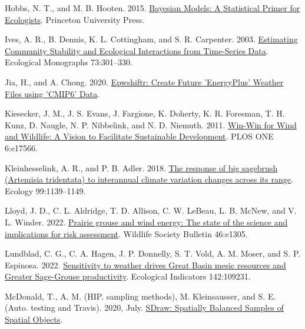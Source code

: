 \documentclass[
  12pt,
]{article}
\newlength{\cslhangindent}
\newlength{\cslentryspacingunit} %
\newenvironment{CSLReferences}[2] %
 {%
  \setlength{\parindent}{0pt}
  \ifodd #1
  \let\oldpar\par
  \def\par{\hangindent=\cslhangindent\oldpar}
  \fi
  \setlength{\parskip}{#2\cslentryspacingunit}
 }%
 {}
\begin{document}
\begin{CSLReferences}{1}{0}
\leavevmode{}%
Hobbs, N. T., and M. B. Hooten. 2015. \href{https://press.princeton.edu/books/hardcover/9780691159287/bayesian-models}{Bayesian {Models}: {A} {Statistical} {Primer} for {Ecologists}}. Princeton University Press.

\leavevmode{}%
Ives, A. R., B. Dennis, K. L. Cottingham, and S. R. Carpenter. 2003. \href{https://doi.org/10.1890/0012-9615(2003)073\%5B0301:ECSAEI\%5D2.0.CO;2}{Estimating {Community} {Stability} and {Ecological} {Interactions} from {Time}-{Series} {Data}}. Ecological Monographs 73:301--330.

\leavevmode{}%
Jia, H., and A. Chong. 2020. \href{https://CRAN.R-project.org/package=epwshiftr}{Epwshiftr: {Create} {Future} '{EnergyPlus}' {Weather} {Files} using '{CMIP6}' {Data}}.

\leavevmode{}%
Kiesecker, J. M., J. S. Evans, J. Fargione, K. Doherty, K. R. Foresman, T. H. Kunz, D. Naugle, N. P. Nibbelink, and N. D. Niemuth. 2011. \href{https://doi.org/10.1371/journal.pone.0017566}{Win-{Win} for {Wind} and {Wildlife}: {A} {Vision} to {Facilitate} {Sustainable} {Development}}. PLOS ONE 6:e17566.

\leavevmode{}%
Kleinhesselink, A. R., and P. B. Adler. 2018. \href{https://doi.org/10.1002/ecy.2191}{The response of big sagebrush ({Artemisia} tridentata) to interannual climate variation changes across its range}. Ecology 99:1139--1149.

\leavevmode{}%
Lloyd, J. D., C. L. Aldridge, T. D. Allison, C. W. LeBeau, L. B. McNew, and V. L. Winder. 2022. \href{https://doi.org/10.1002/wsb.1305}{Prairie grouse and wind energy: {The} state of the science and implications for risk assessment}. Wildlife Society Bulletin 46:e1305.

\leavevmode{}%
Lundblad, C. G., C. A. Hagen, J. P. Donnelly, S. T. Vold, A. M. Moser, and S. P. Espinosa. 2022. \href{https://doi.org/10.1016/j.ecolind.2022.109231}{Sensitivity to weather drives {Great} {Basin} mesic resources and {Greater} {Sage}-{Grouse} productivity}. Ecological Indicators 142:109231.

\leavevmode{}%
McDonald, T., A. M. (HIP. sampling methods), M. Kleinsausser, and S. E. (Auto. testing and Travis). 2020, July. \href{https://CRAN.R-project.org/package=SDraw}{{SDraw}: {Spatially} {Balanced} {Samples} of {Spatial} {Objects}}.


\end{CSLReferences}
\end{document}
